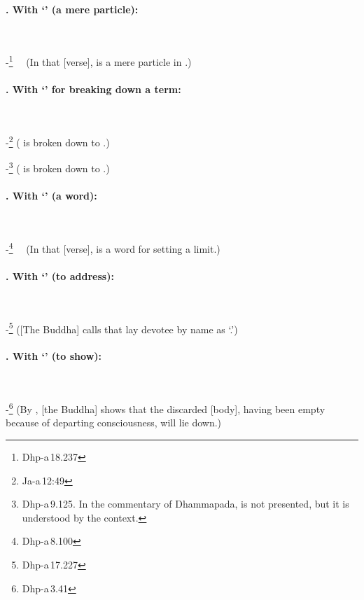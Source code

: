 \paragraph*{. With `' (a mere particle):}\ \par
-\footnote{Dhp-a\,18.237} \ \ (In that [verse],  is a mere particle in .)\par

\paragraph*{. With `' for breaking down a term:}\ \par
-\footnote{Ja-a\,12:49} ( is broken down to .)\par
-\footnote{Dhp-a\,9.125. In the commentary of Dhammapada,  is not presented, but it is understood by the context.} ( is broken down to .)\par

\paragraph*{. With `' (a word):}\ \par
-\footnote{Dhp-a\,8.100} \ \ (In that [verse],  is a word for setting a limit.)\par

\paragraph*{. With `' (to address):}\ \par
-\footnote{Dhp-a\,17.227} ([The Buddha] calls that lay devotee by name as `.')\par

\paragraph*{. With `' (to show):}\ \par
-\footnote{Dhp-a\,3.41} (By , [the Buddha] shows that the discarded [body], having been empty because of departing consciousness, will lie down.)\par

